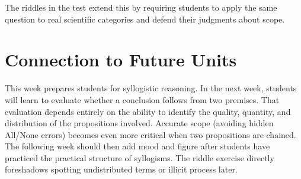 \documentclass[12pt]{article}
\begin{document}
The riddles in the test extend this by requiring students to apply the same question to real scientific categories and defend their judgments about scope.

\section*{Connection to Future Units}
This week prepares students for syllogistic reasoning. In the next week, students will learn to evaluate whether a conclusion follows from two premises. That evaluation depends entirely on the ability to identify the quality, quantity, and distribution of the propositions involved. Accurate scope (avoiding hidden All/None errors) becomes even more critical when two propositions are chained. The following week should then add mood and figure after students have practiced the practical structure of syllogisms. The riddle exercise directly foreshadows spotting undistributed terms or illicit process later.
\end{document}
